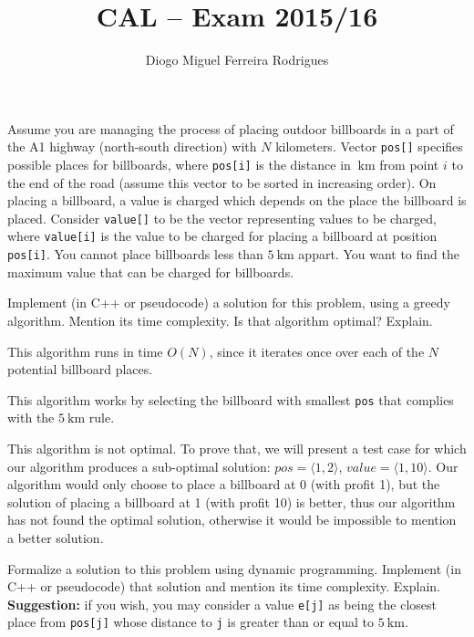 \documentclass{cal}
\title{CAL -- Exam 2015/16}
\author{Diogo Miguel Ferreira Rodrigues \\ \email{dmfrodrigues2000@gmail.com}}
\begin{document}
{
\renewcommand{\thechapter}{\arabic{chapter}N}
\setcounter{chapter}{15}

Assume you are managing the process of placing outdoor billboards in a part of the A1 highway (north-south direction) with $N$ kilometers. Vector \texttt{pos[]} specifies possible places for billboards, where \texttt{pos[i]} is the distance in $\SI{}{\kilo\metre}$ from point $i$ to the end of the road (assume this vector to be sorted in increasing order). On placing a billboard, a value is charged which depends on the place the billboard is placed. Consider \texttt{value[]} to be the vector representing values to be charged, where \texttt{value[i]} is the value to be charged for placing a billboard at position \texttt{pos[i]}. You cannot place billboards less than $\SI{5}{\kilo\metre}$ appart. You want to find the maximum value that can be charged for billboards.

Implement (in C++ or pseudocode) a solution for this problem, using a greedy algorithm. Mention its time complexity. Is that algorithm optimal? Explain.

\ansseparator



This algorithm runs in time $O(N)$, since it iterates once over each of the $N$ potential billboard places.

This algorithm works by selecting the billboard with smallest \texttt{pos} that complies with the $\SI{5}{\kilo\metre}$ rule.

This algorithm is not optimal. To prove that, we will present a test case for which our algorithm produces a sub-optimal solution: $pos = \langle 1, 2 \rangle$, $value = \langle 1, 10 \rangle$. Our algorithm would only choose to place a billboard at 0 (with profit 1), but the solution of placing a billboard at 1 (with profit 10) is better, thus our algorithm has not found the optimal solution, otherwise it would be impossible to mention a better solution.

Formalize a solution to this problem using dynamic programming. Implement (in C++ or pseudocode) that solution and mention its time complexity. Explain.\\

\textbf{Suggestion:} if you wish, you may consider a value \texttt{e[j]} as being the closest place from \texttt{pos[j]} whose distance to \texttt{j} is greater than or equal to $\SI{5}{\kilo\metre}$.

}
\end{document}
